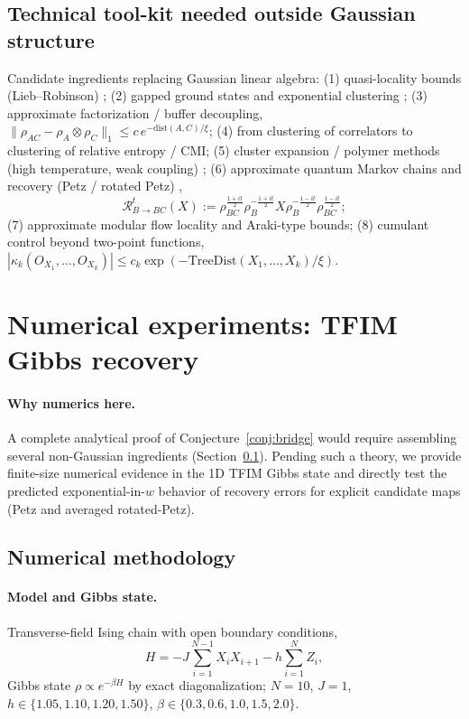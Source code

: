 \documentclass[11pt]{article}
\newcommand{\dist}{\mathrm{dist}}
\begin{document}
\subsection{Technical tool-kit needed outside Gaussian structure}
\label{sec:toolkit}

Candidate ingredients replacing Gaussian linear algebra:
(1) quasi-locality bounds (Lieb--Robinson) \cite{LR};
(2) gapped ground states and exponential clustering \cite{HK};
(3) approximate factorization / buffer decoupling,
$\|\rho_{AC} - \rho_A \otimes \rho_C\|_1 \le c\,e^{-\dist(A,C)/\xi}$;
(4) from clustering of correlators to clustering of relative entropy / CMI;
(5) cluster expansion / polymer methods (high temperature, weak coupling)
\cite{Kliesch};
(6) approximate quantum Markov chains and recovery (Petz / rotated Petz)
\cite{FR,Petz,JRSWW},
\begin{equation}
\mathcal{R}^t_{B\to BC}(X) :=
\rho_{BC}^{\frac{1+it}{2}} \rho_B^{-\frac{1+it}{2}} X
\rho_B^{-\frac{1-it}{2}} \rho_{BC}^{\frac{1-it}{2}};
\label{eq:rotpetz}
\end{equation}
(7) approximate modular flow locality and Araki-type bounds;
(8) cumulant control beyond two-point functions,
$|\kappa_k(O_{X_1},\dots,O_{X_k})| \le c_k
\exp(-\mathrm{TreeDist}(X_1,\dots,X_k)/\xi)$.

\section{Numerical experiments: TFIM Gibbs recovery}

\paragraph{Why numerics here.}
A complete analytical proof of Conjecture~\ref{conj:bridge} would require
assembling several non-Gaussian ingredients (Section~\ref{sec:toolkit}).
Pending such a theory, we provide finite-size numerical evidence in the 1D
TFIM Gibbs state and directly test the predicted exponential-in-$w$ behavior
of recovery errors for explicit candidate maps (Petz and averaged
rotated-Petz).

\subsection{Numerical methodology}

\paragraph{Model and Gibbs state.}
Transverse-field Ising chain with open boundary conditions,
\begin{equation}
H = -J \sum_{i=1}^{N-1} X_i X_{i+1} - h \sum_{i=1}^{N} Z_i,
\end{equation}
Gibbs state $\rho \propto e^{-\beta H}$ by exact diagonalization; $N = 10$,
$J = 1$, $h \in \{1.05, 1.10, 1.20, 1.50\}$,
$\beta \in \{0.3, 0.6, 1.0, 1.5, 2.0\}$.
\end{document}
